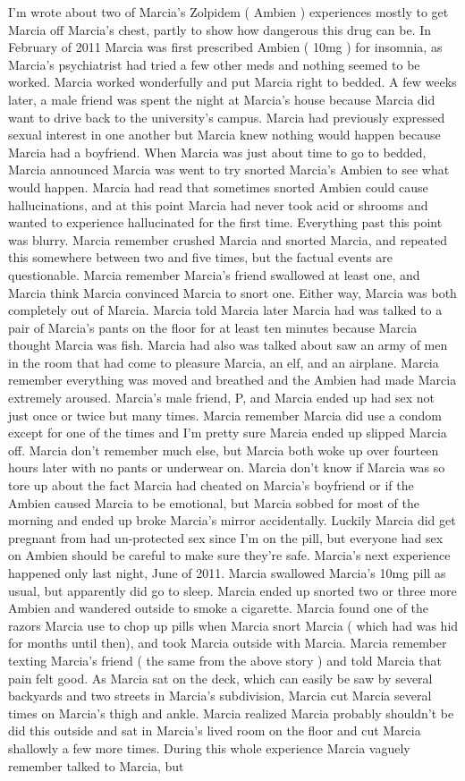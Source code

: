 \documentclass[12pt]{book}
\begin{document}
I'm wrote about two of Marcia's Zolpidem ( Ambien ) experiences mostly to get Marcia off Marcia's chest, partly to show how dangerous this drug can be. In February of 2011 Marcia was first prescribed Ambien ( 10mg ) for insomnia, as Marcia's psychiatrist had tried a few other meds and nothing seemed to be worked. Marcia worked wonderfully and put Marcia right to bedded. A few weeks later, a male friend was spent the night at Marcia's house because Marcia did want to drive back to the university's campus. Marcia had previously expressed sexual interest in one another but Marcia knew nothing would happen because Marcia had a boyfriend. When Marcia was just about time to go to bedded, Marcia announced Marcia was went to try snorted Marcia's Ambien to see what would happen. Marcia had read that sometimes snorted Ambien could cause hallucinations, and at this point Marcia had never took acid or shrooms and wanted to experience hallucinated for the first time. Everything past this point was blurry. Marcia remember crushed Marcia and snorted Marcia, and repeated this somewhere between two and five times, but the factual events are questionable. Marcia remember Marcia's friend swallowed at least one, and Marcia think Marcia convinced Marcia to snort one. Either way, Marcia was both completely out of Marcia. Marcia told Marcia later Marcia had was talked to a pair of Marcia's pants on the floor for at least ten minutes because Marcia thought Marcia was fish. Marcia had also was talked about saw an army of men in the room that had come to pleasure Marcia, an elf, and an airplane. Marcia remember everything was moved and breathed and the Ambien had made Marcia extremely aroused. Marcia's male friend, P, and Marcia ended up had sex not just once or twice but many times. Marcia remember Marcia did use a condom except for one of the times and I'm pretty sure Marcia ended up slipped Marcia off. Marcia don't remember much else, but Marcia both woke up over fourteen hours later with no pants or underwear on. Marcia don't know if Marcia was so tore up about the fact Marcia had cheated on Marcia's boyfriend or if the Ambien caused Marcia to be emotional, but Marcia sobbed for most of the morning and ended up broke Marcia's mirror accidentally. Luckily Marcia did get pregnant from had un-protected sex since I'm on the pill, but everyone had sex on Ambien should be careful to make sure they're safe. Marcia's next experience happened only last night, June of 2011. Marcia swallowed Marcia's 10mg pill as usual, but apparently did go to sleep. Marcia ended up snorted two or three more Ambien and wandered outside to smoke a cigarette. Marcia found one of the razors Marcia use to chop up pills when Marcia snort Marcia ( which had was hid for months until then), and took Marcia outside with Marcia. Marcia remember texting Marcia's friend ( the same from the above story ) and told Marcia that pain felt good. As Marcia sat on the deck, which can easily be saw by several backyards and two streets in Marcia's subdivision, Marcia cut Marcia several times on Marcia's thigh and ankle. Marcia realized Marcia probably shouldn't be did this outside and sat in Marcia's lived room on the floor and cut Marcia shallowly a few more times. During this whole experience Marcia vaguely remember talked to Marcia, but 
\end{document}
